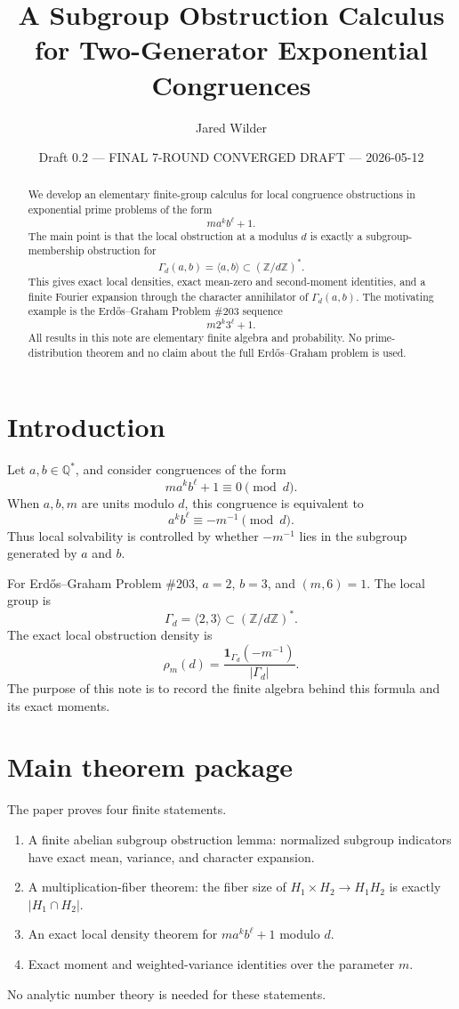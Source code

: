 \documentclass[11pt]{article}
\title{A Subgroup Obstruction Calculus for Two-Generator Exponential Congruences}
\author{Jared Wilder}
\date{Draft 0.2 --- FINAL 7-ROUND CONVERGED DRAFT --- 2026-05-12}
\newcommand{\Z}{\mathbb Z}
\newcommand{\Q}{\mathbb Q}
\newcommand{\1}{\mathbf 1}
\begin{document}
\maketitle

\begin{abstract}
We develop an elementary finite-group calculus for local congruence obstructions in exponential prime problems of the form
\[
m a^k b^\ell+1.
\]
The main point is that the local obstruction at a modulus \(d\) is exactly a subgroup-membership obstruction for
\[
\Gamma_d(a,b)=\langle a,b\rangle\subset(\Z/d\Z)^*.
\]
This gives exact local densities, exact mean-zero and second-moment identities, and a finite Fourier expansion through the character annihilator of \(\Gamma_d(a,b)\).  The motivating example is the Erd\H{o}s--Graham Problem \#203 sequence
\[
m2^k3^\ell+1.
\]
All results in this note are elementary finite algebra and probability. No prime-distribution theorem and no claim about the full Erd\H{o}s--Graham problem is used.
\end{abstract}

\section{Introduction}

Let \(a,b\in\Q^*\), and consider congruences of the form
\[
m a^k b^\ell+1\equiv0\pmod d.
\]
When \(a,b,m\) are units modulo \(d\), this congruence is equivalent to
\[
a^k b^\ell\equiv -m^{-1}\pmod d.
\]
Thus local solvability is controlled by whether \(-m^{-1}\) lies in the subgroup generated by \(a\) and \(b\).

For Erd\H{o}s--Graham Problem \#203, \(a=2\), \(b=3\), and \((m,6)=1\).  The local group is
\[
\Gamma_d=\langle2,3\rangle\subset(\Z/d\Z)^*.
\]
The exact local obstruction density is
\[
\rho_m(d)=\frac{\1_{\Gamma_d}(-m^{-1})}{|\Gamma_d|}.
\]
The purpose of this note is to record the finite algebra behind this formula and its exact moments.


\section{Main theorem package}

The paper proves four finite statements.
\begin{enumerate}[leftmargin=1.5em]
\item A finite abelian subgroup obstruction lemma: normalized subgroup indicators have exact mean, variance, and character expansion.
\item A multiplication-fiber theorem: the fiber size of \(H_1\times H_2\to H_1H_2\) is exactly \(|H_1\cap H_2|\).
\item An exact local density theorem for \(m a^k b^\ell+1\) modulo \(d\).
\item Exact moment and weighted-variance identities over the parameter \(m\).
\end{enumerate}
No analytic number theory is needed for these statements.
\end{document}
